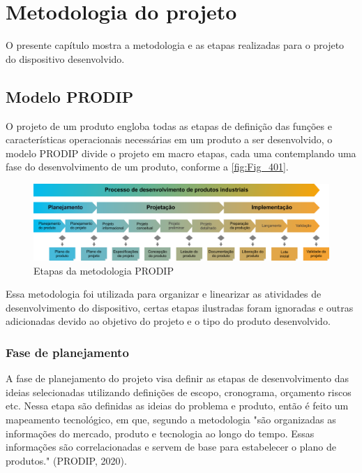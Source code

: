 


\chapter{Metodologia do projeto}\label{cap:Metodologia do projeto}

O presente capítulo mostra a metodologia e as etapas realizadas para o projeto do dispositivo desenvolvido.

\section{Modelo PRODIP}

O projeto de um produto engloba todas as etapas de definição das funções e características operacionais necessárias em um produto a ser desenvolvido, o modelo PRODIP divide o projeto em macro etapas, cada uma contemplando uma fase do desenvolvimento de um produto, conforme a \autoref{fig:Fig_401}.

\begin{figure}[htb]
	\caption{\label{fig:Fig_401}Etapas da metodologia PRODIP}
	\begin{center}
		\includegraphics[width=\textwidth]{images/img401.png}
	\end{center}
\end{figure}

Essa metodologia foi utilizada para organizar e linearizar as atividades de desenvolvimento do dispositivo, certas etapas ilustradas foram ignoradas e outras adicionadas devido ao objetivo do projeto e o tipo do produto desenvolvido.

\subsection{Fase de planejamento}

A fase de planejamento do projeto visa definir as etapas de desenvolvimento das ideias selecionadas utilizando definições de escopo, cronograma, orçamento riscos etc. Nessa etapa são definidas as ideias do problema e produto, então é feito um mapeamento tecnológico, em que, segundo a metodologia "são organizadas as informações do mercado, produto e tecnologia ao longo do tempo. Essas informações são correlacionadas e servem de base para estabelecer o plano de produtos." (PRODIP, 2020).

